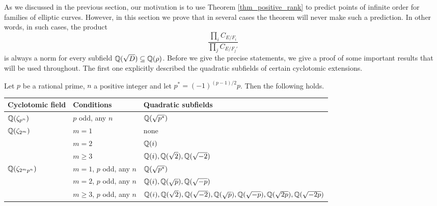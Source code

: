 As we discussed in the previous section, our motivation is to use Theorem \ref*{thm_positive_rank} to predict points of infinite order for families of elliptic curves. However, in this section we prove that in several cases the theorem will never make such a prediction. In other words, in such cases, the product 
$$\frac{\prod_i C_{E/F_i}}{\prod_j C_{E/F_j'}}$$ 
is always a norm for every subfield $\mathbb{Q}(\sqrt{D})\subseteq\mathbb{Q}(\rho)$. Before we give the precise statements, we give a proof of some important results that will be used throughout. The first one explicitly described the quadratic subfields of certain cyclotomic extensions.

\begin{lemma}\label{lem_subfields}
    Let $p$ be a rational prime, $n$ a positive integer and let $p^*=(-1)^{(p-1)/2}p$. Then the following holds.

    \begin{table}[!ht]
        \centering
        \begin{tabular}{|l|l|l|}
        \hline
        Cyclotomic field                    & Conditions & Quadratic subfields                   \\ \hline
        $\mathbb{Q}(\zeta_{p^n})$                  & $p$ odd, any $n$    & $\mathbb{Q}(\sqrt{p^*})$            \\ \hline
        \multirow{3}{*}{$\mathbb{Q}(\zeta_{2^m})$} & $m=1$      & none                                  \\ \cline{2-3} 
                                            & $m=2$      & $\mathbb{Q}(i)$                              \\ \cline{2-3} 
                                            & $m\geq3$   & $\mathbb{Q}(i),\mathbb{Q}(\sqrt{2}),\mathbb{Q}(\sqrt{-2})$ \\ \hline
        \multirow{3}{*}{$\mathbb{Q}(\zeta_{2^mp^n})$}  & $m=1$, $p$ odd, any $n$      & $\mathbb{Q}(\sqrt{p^*})$     \\ \cline{2-3} 
                                            & $m=2$, $p$ odd, any $n$      & $\mathbb{Q}(i),\mathbb{Q}(\sqrt{p}),\mathbb{Q}(\sqrt{-p})$                              \\ \cline{2-3}
                                            & $m\geq 3$, $p$ odd, any $n$      & $\mathbb{Q}(i),\mathbb{Q}(\sqrt{2}),\mathbb{Q}(\sqrt{-2}),\mathbb{Q}(\sqrt{p}),\mathbb{Q}(\sqrt{-p}),\mathbb{Q}(\sqrt{2p}),\mathbb{Q}(\sqrt{-2p})$                              \\ 
                                             \hline
        \end{tabular}
        \end{table}

\end{lemma}

